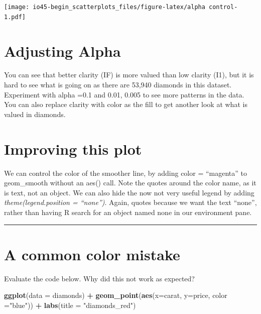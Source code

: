 \documentclass[
]{book}
\newenvironment{Shaded}{\begin{snugshade}}{\end{snugshade}}
\newcommand{\DataTypeTok}[1]{\textcolor[rgb]{0.13,0.29,0.53}{#1}}
\newcommand{\KeywordTok}[1]{\textcolor[rgb]{0.13,0.29,0.53}{\textbf{#1}}}
\newcommand{\NormalTok}[1]{#1}
\newcommand{\OperatorTok}[1]{\textcolor[rgb]{0.81,0.36,0.00}{\textbf{#1}}}
\newcommand{\StringTok}[1]{\textcolor[rgb]{0.31,0.60,0.02}{#1}}
\begin{document}
\texttt{[image: io45-begin\_scatterplots\_files/figure-latex/alpha control-1.pdf]}

\hypertarget{adjusting-alpha}{%
\chapter{Adjusting Alpha}\label{adjusting-alpha}}

You can see that better clarity (IF) is more valued than low clarity (I1), but it is hard to see what is going on as there are 53,940 diamonds in this dataset. Experiment with alpha =0.1 and 0.01, 0.005 to see more patterns in the data. You can also replace clarity with color as the fill to get another look at what is valued in diamonds.

\hypertarget{improving-this-plot}{%
\chapter{Improving this plot}\label{improving-this-plot}}

We can control the color of the smoother line, by adding color = ``magenta'' to geom\_smooth without an aes() call. Note the quotes around the color name, as it is text, not an object. We can also hide the now not very useful legend by adding \emph{theme(legend.position = ``none'')}. Again, quotes because we want the text ``none'', rather than having R search for an object named none in our environment pane.

\begin{center}\rule{0.5\linewidth}{0.5pt}\end{center}

\hypertarget{a-common-color-mistake}{%
\chapter{A common color mistake}\label{a-common-color-mistake}}

Evaluate the code below.
Why did this not work as expected?

\begin{Shaded}
\begin{Highlighting}[]
\KeywordTok{ggplot}\NormalTok{(}\DataTypeTok{data =}\NormalTok{ diamonds) }\OperatorTok{+}
\StringTok{  }\KeywordTok{geom_point}\NormalTok{(}\KeywordTok{aes}\NormalTok{(}\DataTypeTok{x=}\NormalTok{carat, }\DataTypeTok{y=}\NormalTok{price, }\DataTypeTok{color =}\StringTok{"blue"}\NormalTok{)) }\OperatorTok{+}
\StringTok{  }\KeywordTok{labs}\NormalTok{(}\DataTypeTok{title =} \StringTok{"diamonds_red"}\NormalTok{)}
\end{Highlighting}
\end{Shaded}
\end{document}
